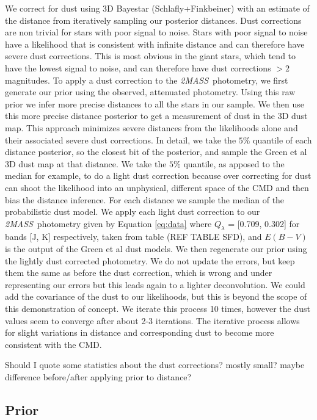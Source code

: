 \documentclass[modern]{aastex61}
\newcommand{\acronym}[1]{{\small{#1}}}
\newcommand{\project}[1]{\textsl{#1}}
\newcommand{\tmass}{\project{\acronym{2MASS}}}
\newcommand{\cmd}{\acronym{CMD}}
\begin{document}
We correct for dust using 3D Bayestar (Schlafly+Finkbeiner) with an estimate of the distance from iteratively sampling our posterior distances. Dust corrections are non trivial for stars with poor signal to noise. Stars with poor signal to noise have a likelihood that is consistent with infinite distance and can therefore have severe dust corrections. This is most obvious in the giant stars, which tend to have the lowest signal to noise, and can therefore have dust corrections $> 2$ magnitudes. To apply a dust correction to the \tmass\ photometry, we first generate our prior using the observed, attenuated photometry. Using this raw prior we infer more precise distances to all the stars in our sample. We then use this more precise distance posterior to get a measurement of dust in the 3D dust map. This approach minimizes severe distances from the likelihoods alone and their associated severe dust corrections. In detail, we take the $5\%$ quantile of each distance posterior, so the closest bit of the posterior, and sample the Green et al 3D dust map at that distance. We take the $5\%$ quantile, as apposed to the median for example, to do a light dust correction because over correcting for dust can shoot the likelihood into an unphysical, different space of the CMD and then bias the distance inference. For each distance we sample the median of the probabilistic dust model. We apply each light dust correction to our \tmass\ photometry given by Equation \ref{eq:data} where $Q_{\lambda}$ = [0.709, 0.302] for bands [J, K] respectively, taken from table (REF TABLE SFD), and $E(B-V)$ is the output of the Green et al dust models. We then regenerate our prior using the lightly dust corrected photometry. We do not update the errors, but keep them the same as before the dust correction, which is wrong and under representing our errors but this leads again to a lighter deconvolution. We could add the covariance of the dust to our likelihoods, but this is beyond the scope of this demonstration of concept. We iterate this process 10 times, however the dust values seem to converge after about 2-3 iterations. The iterative process allows for slight variations in distance and corresponding dust to become more consistent with the \cmd.

Should I quote some statistics about the dust corrections? mostly small? maybe difference before/after applying prior to distance?

\subsection{Prior}
\end{document}
